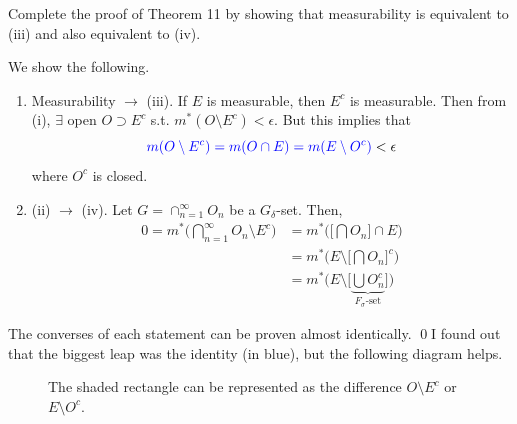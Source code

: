   \begin{exercise}[Royden 2.16]
    Complete the proof of Theorem 11 by showing that measurability is equivalent to (iii) and also equivalent to (iv).
  \end{exercise}
  \begin{solution}
    We show the following. 
    \begin{enumerate}
      \item Measurability $\rightarrow$ (iii). If $E$ is measurable, then $E^c$ is measurable. Then from (i), $\exists$ open $O \supset E^c$ s.t. $m^\ast (O \setminus E^c) < \epsilon$. But this implies that 
        \begin{equation}
          \textcolor{blue}{m(O \setminus E^c) = m(O \cap E) = m(E \setminus O^c)} < \epsilon
        \end{equation}
        where $O^c$ is closed. 
      \item (ii) $\rightarrow$ (iv). Let $G = \cap_{n=1}^\infty O_n$ be a $G_\delta$-set. Then, 
        \begin{align}
          0 = m^\ast \bigg( \bigcap_{n=1}^\infty O_n  \setminus E^c \bigg) & = m^\ast \bigg( \Big[ \bigcap O_n \Big] \cap E \bigg) \\ 
                                                                           & = m^\ast \bigg( E \setminus \Big[ \bigcap O_n \Big]^c \bigg) \\ 
                                                                           & = m^\ast \bigg( E \setminus \Big[ \underbrace{\bigcup O_n^c}_{F_\sigma\text{-set}} \Big]\bigg) 
        \end{align}
    \end{enumerate}
    The converses of each statement can be proven almost identically. \qed I found out that the biggest leap was the identity (in blue), but the following diagram helps. 
    \begin{figure}[H]
      \centering 
      \caption{The shaded rectangle can be represented as the difference $O \setminus E^c$ or $E \setminus O^c$.} 
    \end{figure}
  \end{solution}

